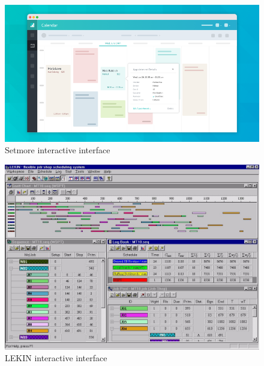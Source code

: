 \begin{figure}[H]
	\begin{center}
		\includegraphics[scale=0.4]{figures/setmore.png}
	\end{center}
	\caption{Setmore interactive interface}
\end{figure}

\begin{figure}[H]
	\begin{center}
		\includegraphics{figures/lekin.jpg}
	\end{center}
	\caption{LEKIN interactive interface}
\end{figure}

